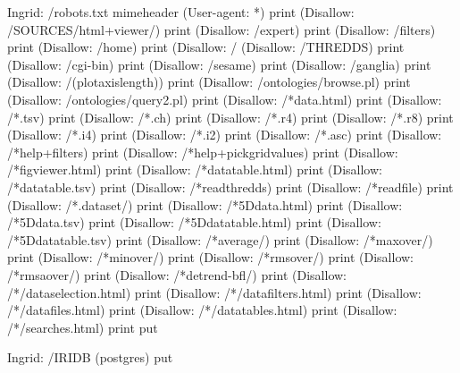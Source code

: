 \documentclass{article}
\begin{document}
\begin{ingrid}
Ingrid: /robots.txt {
mimeheader
(User-agent: *\n) print
(Disallow: /SOURCES/html+viewer/\n) print
(Disallow: /expert\n) print
(Disallow: /filters\n) print
(Disallow: /home\n) print
(Disallow: /%
(Disallow: /THREDDS\n) print
(Disallow: /cgi-bin\n) print
(Disallow: /sesame\n) print
(Disallow: /ganglia\n) print
(Disallow: /(plotaxislength)\n) print
(Disallow: /ontologies/browse.pl\n) print
(Disallow: /ontologies/query2.pl\n) print
(Disallow: /*data.html\n) print
(Disallow: /*.tsv\n) print
(Disallow: /*.ch\n) print
(Disallow: /*.r4\n) print
(Disallow: /*.r8\n) print
(Disallow: /*.i4\n) print
(Disallow: /*.i2\n) print
(Disallow: /*.asc\n) print
(Disallow: /*help+filters\n) print
(Disallow: /*help+pickgridvalues\n) print
(Disallow: /*figviewer.html\n) print
(Disallow: /*datatable.html\n) print
(Disallow: /*datatable.tsv\n) print
(Disallow: /*readthredds\n) print
(Disallow: /*readfile\n) print
(Disallow: /*.dataset/\n) print
(Disallow: /*5Ddata.html\n) print
(Disallow: /*5Ddata.tsv\n) print
(Disallow: /*5Ddatatable.html\n) print
(Disallow: /*5Ddatatable.tsv\n) print
(Disallow: /*average/\n) print
(Disallow: /*maxover/\n) print
(Disallow: /*minover/\n) print
(Disallow: /*rmsover/\n) print
(Disallow: /*rmsaover/\n) print
(Disallow: /*detrend-bfl/\n) print
(Disallow: /*/dataselection.html\n) print
(Disallow: /*/datafilters.html\n) print
(Disallow: /*/datafiles.html\n) print
(Disallow: /*/datatables.html\n) print
(Disallow: /*/searches.html\n) print
} put
\end{ingrid}

\begin{ingrid}
Ingrid: /IRIDB (postgres) put
\end{ingrid}
\end{document}

